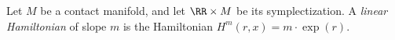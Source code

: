 
 
 Let  $M$ be a contact manifold, and let $\RR\times M$ be its symplectization. A \emph{linear Hamiltonian} of slope $m$ is the Hamiltonian $H^m(r, x)= m\cdot \exp(r)$.
 \label{def:linearHamiltonian}
 